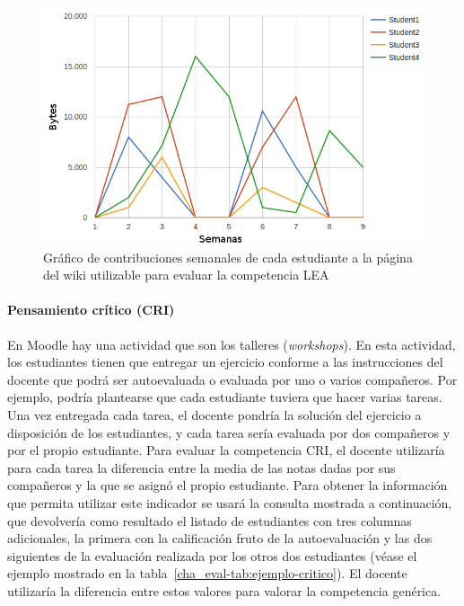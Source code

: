 \begin{figure}
  \begin{center}
    \includegraphics[scale=0.6]{EvcEjemploLiderazgoWiki.png}
  \end{center}
  \caption{Gráfico de contribuciones semanales de cada estudiante a la página del wiki utilizable para evaluar la competencia LEA}
  \label{cha:eval-fig:ejemplo-liderazgo}
\end{figure}

				\paragraph*{Pensamiento crítico (CRI)}
				En Moodle hay una actividad que son los talleres (\emph{workshops}). En esta actividad, los estudiantes tienen que entregar un ejercicio conforme a las instrucciones del docente que podrá ser autoevaluada o evaluada por uno o varios compañeros. Por ejemplo, podría plantearse que cada estudiante tuviera que hacer varias tareas. Una vez entregada cada tarea, el docente pondría la solución del ejercicio a disposición de los estudiantes, y cada tarea sería evaluada por dos compañeros y por el propio estudiante. Para evaluar la competencia CRI, el docente utilizaría para cada tarea la diferencia entre la media de las notas dadas por sus compañeros y la que se asignó el propio estudiante. Para obtener la información que permita utilizar este indicador se usará la consulta mostrada a continuación, que devolvería como resultado el listado de estudiantes con tres columnas adicionales, la primera con la calificación fruto de la autoevaluación y las dos siguientes de la evaluación realizada por los otros dos estudiantes (véase el ejemplo mostrado en la tabla~\ref{cha_eval-tab:ejemplo-critico}). El docente utilizaría la diferencia entre estos valores para valorar la competencia genérica.


